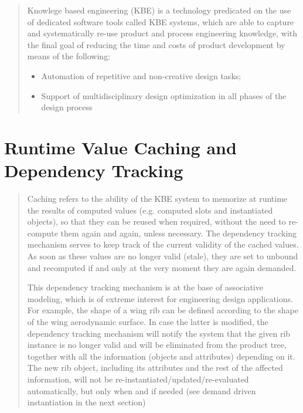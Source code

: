 \documentclass [11pt]{book}
\begin{document}
\begin{quote}
Knowlege based engineering (KBE) is a technology predicated on
the use of dedicated software tools called KBE systems, which are able
to capture and systematically re-use product and process engineering
knowledge, with the final goal of reducing the time and costs of
product development by means of the following:

\begin{itemize}

\item Automation of repetitive and non-creative design tasks;

\item Support of multidisciplinary design optimization in all  
phases of the design process

\end{itemize}



\end{quote}


\section{Runtime Value Caching and Dependency Tracking}

\label{sec:runtimevaluecachinganddependencytracking}



\begin{quote}


Caching refers to the ability of the KBE system to memorize at
runtime the results of computed values (e.g. computed slots and
instantiated objects), so that they can be reused when required,
without the need to re-compute them again and again, unless necessary.
The dependency tracking mechanism serves to keep track of the current
validity of the cached values.  As soon as these values are no longer
valid (stale), they are set to unbound and recomputed if and only at
the very moment they are again demanded.



This dependency tracking mechanism is at the base of
associative modeling, which is of extreme interest for engineering
design applications. For example, the shape of a wing rib can be
defined according to the shape of the wing aerodynamic surface. In
case the latter is modified, the dependency tracking mechanism will
notify the system that the given rib instance is no longer valid and
will be eliminated from the product tree, together with all the
information (objects and attributes) depending on it. The new rib
object, including its attributes and the rest of the affected
information, will not be re-instantiated/updated/re-evaluated
automatically, but only when and if needed (see demand driven
instantiation in the next section)



\end{quote}
\end{document}
